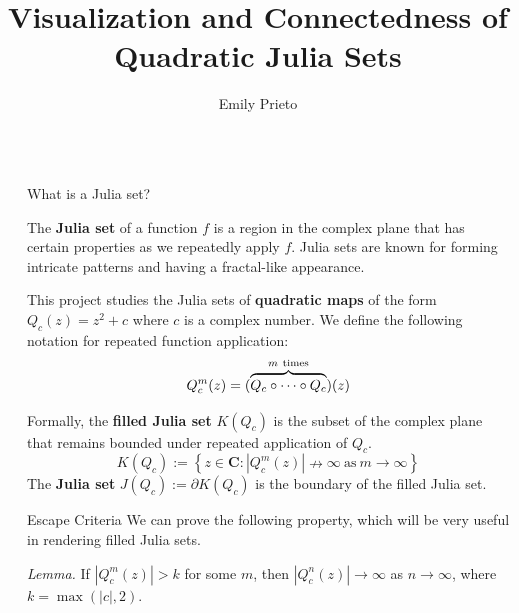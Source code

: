 \documentclass[final]{beamer}
\title{Visualization and Connectedness of %
Quadratic Julia Sets}
\author{Emily Prieto}
\newlength{\sepwidth}
\newlength{\colwidth}
\newcommand{\separatorcolumn}{\begin{column}{\sepwidth}\end{column}}
\newcommand{\setbold}{\mathbf}
\newcommand{\CC}{\setbold{C}}
\begin{document}

\begin{frame}[t]
\begin{columns}[t]
\separatorcolumn

\begin{column}{\colwidth}

	\begin{block}{What is a Julia set?}

		The \textbf{Julia set} of a function $f$ is a
		region in the complex plane that has certain
		properties as we repeatedly apply $f$.
		Julia sets are known for forming intricate
		patterns and having a fractal-like appearance.

		This project studies the Julia sets of
		\textbf{quadratic maps} of the form
		$Q_c(z) = z^2 + c$ where $c$ is a complex number.
		We define the following notation for repeated function application: \[
			Q_c^{m}(z) = (\overbrace{\vphantom{(}Q_c \circ \cdots \circ Q_c}^{m\ \text{times}})(z)
		\]

		Formally, the \textbf{filled Julia set} $K(Q_c)$
		is the subset of the complex plane that remains bounded
		under repeated application of $Q_c$. \[
			K(Q_c) := \left\{ z \in \CC : |Q_c^{m}(z)| \nrightarrow \infty\ \text{as}\ m \rightarrow \infty \right\}
		\]
		The \textbf{Julia set} $J(Q_c) := \partial{} K(Q_c)$ is the boundary
		of the filled Julia set.

	\end{block}

	\begin{alertblock}{Escape Criteria}
		We can prove the following property, which will
		be very useful in rendering filled Julia sets.

    \textit{Lemma.}
		If $|Q_c^{m}(z)| > k$
		for some $m$, then $|Q_c^{n}(z)| \rightarrow \infty$ as $n \rightarrow \infty$,
    where $k = \max(|c|, 2)$.


\end{alertblock}
\end{column}
\end{columns}
\end{frame}
\end{document}
